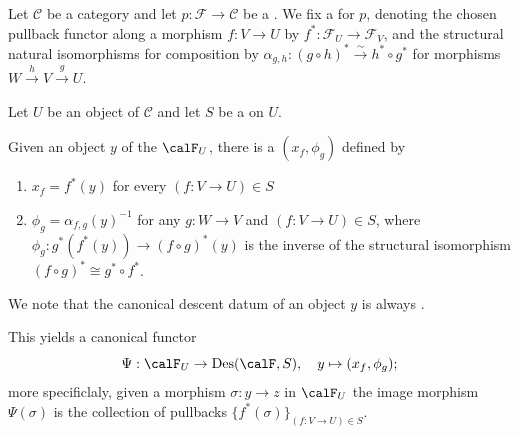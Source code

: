 \begin{definition} \label{definition:descent_datum_associated_to_an_object_in_a_category_fibered_in_groupoids_over_a_category_with_respect_to_a_sieve}
Let $\mathcal{C}$ be a category and let $p: \mathcal{F} \to \mathcal{C}$ be a . We fix a  for $p$, denoting the chosen pullback functor along a morphism $f: V \to U$ by $f^*: \mathcal{F}_U \to \mathcal{F}_V$, and the structural natural isomorphisms for composition by $\alpha_{g,h}: (g \circ h)^* \xrightarrow{\sim} h^* \circ g^*$ for morphisms $W \xrightarrow{h} V \xrightarrow{g} U$.

Let $U$ be an object of $\mathcal{C}$ and let $S$ be a  on $U$. 

Given an object $y$ of the  $\calF_U$, there is a  $(x_f, \phi_g)$ defined by
\begin{enumerate}
    \item $x_f = f^*(y)$ for every $(f: V \to U) \in S$
    \item $\phi_g = \alpha_{f,g} (y)^{-1}$ for any $g: W \to V$ and $(f: V \to U) \in S$, where $\phi_g: g^*(f^*(y)) \to (f \circ g)^*(y)$ is the inverse of the structural isomorphism $(f \circ g)^* \cong g^* \circ f^*$.
\end{enumerate}

We note that the canonical descent datum of an object $y$ is always . 

This yields a canonical functor 
$$\Psi:\calF_U \to \operatorname{Des}(\calF, S), \quad y \mapsto (x_f, \phi_g);$$
more specificlaly, given a morphism $\sigma: y \to z$ in $\calF_U$ the image morphism $\Psi(\sigma)$ is the collection of pullbacks $\{f^*(\sigma)\}_{(f:V \to U) \in S}$.
\end{definition}